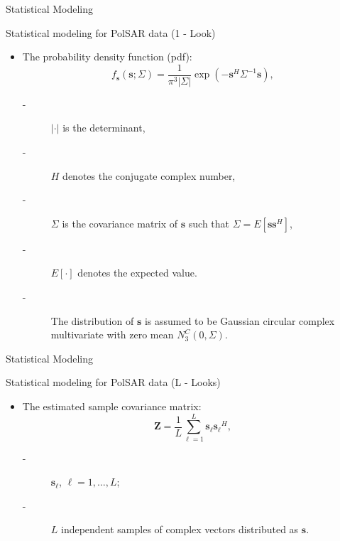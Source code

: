 \documentclass[10pt,professionalfonts]{beamer}
\begin{document}
\begin{frame}[fragile]{Statistical Modeling}
\begin{alertblock}{Statistical modeling for PolSAR data (1 - Look)}
\begin{itemize}
\item The probability density function (pdf):
\begin{equation}
    f_{\mathbf{s}}(\mathbf{s};\Sigma)=\frac{1}{\pi^3|\Sigma|} \exp(-\mathbf{s}^H\Sigma^{-1}\mathbf{s}),
    \label{eq_02}
\end{equation}
        \begin{description}
        \item[-] $|\cdot|$ is the determinant, 
        \item[-] $H$ denotes the conjugate complex number, 
        \item[-] $\Sigma$ is the covariance matrix of $\mathbf{s}$ such that $\Sigma=E[\mathbf{ss}^H]$,
        \item[-] $E[\cdot]$ denotes the expected value. 
        \item[-] The distribution of $\mathbf{s}$ is assumed to be  Gaussian circular complex multivariate with zero mean $N^{C}_3(0,\Sigma)$.
        \end{description}
\end{itemize}
\end{alertblock}
\end{frame}
%
\begin{frame}[fragile]{Statistical Modeling}
\begin{alertblock}{Statistical modeling for PolSAR data (L - Looks)}
\begin{itemize}
\item The estimated sample covariance matrix:
\begin{equation}
    \mathbf{Z}=\frac{1}{L}\sum_{\ell=1}^{L} {\mathbf{s}_\ell}{\mathbf{s}_\ell}^H,
    \label{eq_03}
\end{equation}
\begin{description}
      \item[-] $\mathbf{s}_\ell$, $\ell = 1, \dots, L$;
      \item[-] $L$ independent samples of complex vectors distributed as $\mathbf{s}$. 
\end{description}
\end{itemize}
\end{alertblock}
\end{frame}
\end{document}
